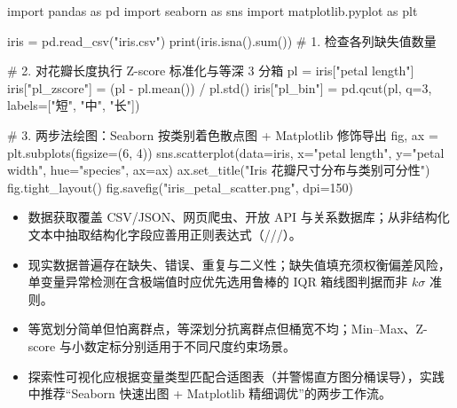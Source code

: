 \begin{codeblock}[language=Python,caption={结合 Pandas 清洗变换与 Seaborn/Matplotlib 的 EDA 示例},label=lst:eda-viz]
import pandas as pd
import seaborn as sns
import matplotlib.pyplot as plt

iris = pd.read_csv("iris.csv")
print(iris.isna().sum())  # 1. 检查各列缺失值数量

# 2. 对花瓣长度执行 Z-score 标准化与等深 3 分箱
pl = iris["petal length"]
iris["pl_zscore"] = (pl - pl.mean()) / pl.std()
iris["pl_bin"] = pd.qcut(pl, q=3, labels=["短", "中", "长"])

# 3. 两步法绘图：Seaborn 按类别着色散点图 + Matplotlib 修饰导出
fig, ax = plt.subplots(figsize=(6, 4))
sns.scatterplot(data=iris, x="petal length", y="petal width", hue="species", ax=ax)
ax.set_title("Iris 花瓣尺寸分布与类别可分性")
fig.tight_layout()
fig.savefig("iris_petal_scatter.png", dpi=150)
\end{codeblock}

\begin{summary}[本章要点]
\begin{itemize}
  \item 数据获取覆盖 CSV/JSON、网页爬虫、开放 API 与关系数据库；从非结构化文本中抽取结构化字段应善用正则表达式（///）。
  \item 现实数据普遍存在缺失、错误、重复与二义性；缺失值填充须权衡偏差风险，单变量异常检测在含极端值时应优先选用鲁棒的 IQR 箱线图判据而非 $k\sigma$ 准则。
  \item 等宽划分简单但怕离群点，等深划分抗离群点但桶宽不均；Min–Max、Z-score 与小数定标分别适用于不同尺度约束场景。
  \item 探索性可视化应根据变量类型匹配合适图表（并警惕直方图分桶误导），实践中推荐“Seaborn 快速出图 + Matplotlib 精细调优”的两步工作流。
\end{itemize}
\end{summary}

